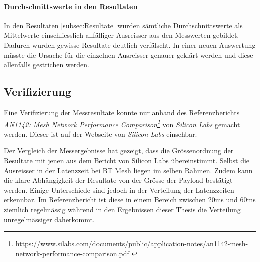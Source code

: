 \paragraph{Durchschnittswerte in den Resultaten}
In den Resultaten \ref{subsec:Resultate} wurden sämtliche Durchschnittswerte als Mittelwerte einschliesslich allfälliger Ausreisser aus den Messwerten gebildet.
Dadurch wurden gewisse Resultate deutlich verfälscht.
In einer neuen Auswertung müsste die Ursache für die einzelnen Ausreisser genauer geklärt werden und diese allenfalls gestrichen werden.


\subsection{Verifizierung}\label{subsec:Verifizierung}
Eine Verifizierung der Messresultate konnte nur anhand des Referenzberichts \textit{AN1142: Mesh Network Performance
	Comparison\footnote{\url{https://www.silabs.com/documents/public/application-notes/an1142-mesh-network-performance-comparison.pdf} \cite{silicon_laboratories_inc_an1142_2020}}} von \textit{Silicon Labs} gemacht werden.
Dieser ist auf der Webseite von \textit{Silicon Labs} einsehbar.

Der Vergleich der Messergebnisse hat gezeigt, dass die Grössenordnung der Resultate mit jenen aus dem Bericht von Silicon Labs übereinstimmt.
Selbst die Ausreisser in der Latenzzeit bei BT Mesh liegen im selben Rahmen.
Zudem kann die klare Abhängigkeit der Resultate von der Grösse der Payload bestätigt werden.
Einige Unterschiede sind jedoch in der Verteilung der Latenzzeiten erkennbar.
Im Referenzbericht ist diese in einem Bereich zwischen 20ms und 60ms ziemlich regelmässig während in den Ergebnissen dieser Thesis die Verteilung unregelmässiger daherkommt.